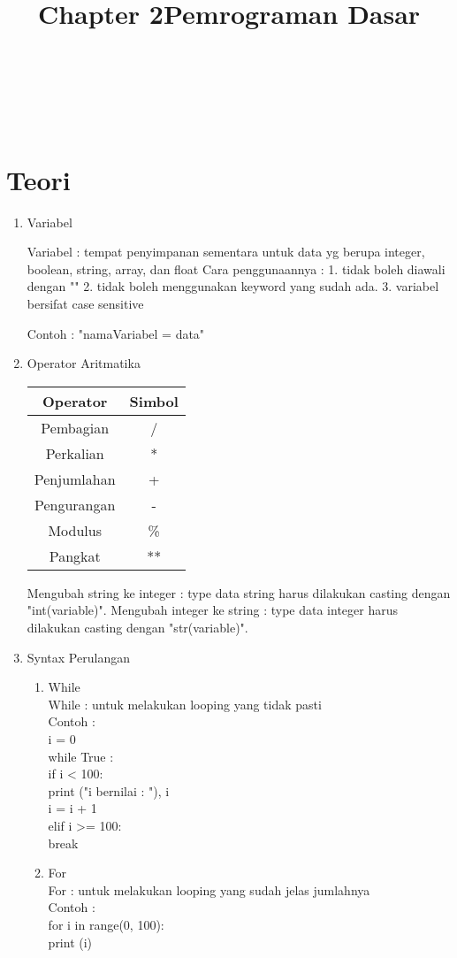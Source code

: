 \clearpage
\setcounter{page}{1}

\begin{center}
\title{\LARGE \bf Chapter 2}\\
\title{\LARGE \bf Pemrograman Dasar}\\
\end{center}

\appendix
\section{Teori}

\begin{enumerate}
\item Variabel

Variabel : tempat penyimpanan sementara untuk data yg berupa integer, boolean, string, array, dan float
Cara penggunaannya : 
1. tidak boleh diawali dengan "\textunderscore" 
2. tidak boleh menggunakan keyword yang sudah ada.
3. variabel bersifat case sensitive

Contoh :
"nama\textunderscore Variabel = data"

\item Operator Aritmatika
\begin{tabular}{|c|c|}
\hline
Operator & Simbol\\
\hline
Pembagian & /\\
\hline
Perkalian & *\\
\hline
Penjumlahan & +\\
\hline
Pengurangan & -\\
\hline
Modulus & \% \\
\hline
Pangkat & **\\
\hline
\end{tabular}

Mengubah string ke integer : type data string harus dilakukan casting dengan "int(variable)".
Mengubah integer ke string : type data integer harus dilakukan casting dengan "str(variable)".

\item Syntax Perulangan
\begin{enumerate}[label=\alph*.]
\item While\\ 
While : untuk melakukan looping yang tidak pasti\\
Contoh :\\
i = 0\\
while True :\\
    if i < 100:\\
        print ("i bernilai : "), i\\
        i = i + 1\\
    elif i >= 100:\\
        break\\
\item For\\
For : untuk melakukan looping yang sudah jelas jumlahnya\\
Contoh :\\
for i in range(0, 100):\\
    print (i)\\
\end{enumerate}


\end{enumerate}
